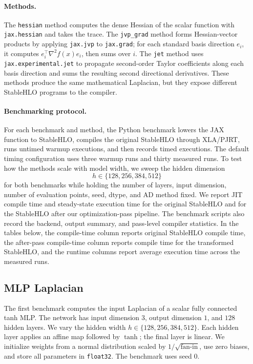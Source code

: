 \documentclass{article}
\theoremstyle{plain}
\theoremstyle{definition}
\theoremstyle{remark}
\begin{document}
\paragraph{Methods.}
The \texttt{hessian} method computes the dense Hessian of the scalar function
with \texttt{jax.hessian} and takes the trace.  The \texttt{jvp\_grad} method
forms Hessian-vector products by applying \texttt{jax.jvp} to
\texttt{jax.grad}; for each standard basis direction \(e_i\), it computes
\(e_i^\top \nabla^2 f(x)e_i\), then sums over \(i\).  The \texttt{jet} method
uses \texttt{jax.experimental.jet} to propagate second-order Taylor
coefficients along each basis direction and sums the resulting second
directional derivatives.  These methods produce the same mathematical
Laplacian, but they expose different StableHLO programs to the compiler.

\paragraph{Benchmarking protocol.}
For each benchmark and method, the Python benchmark lowers the JAX function to
StableHLO, compiles the original StableHLO through XLA/PJRT, runs untimed
warmup executions, and then records timed executions.  The default timing
configuration uses three warmup runs and thirty measured runs.  To test how the
methods scale with model width, we sweep the hidden dimension
\[
  h \in \{128, 256, 384, 512\}
\]
for both benchmarks while holding the number of layers, input dimension, number
of evaluation points, seed, dtype, and AD method fixed.  We report JIT compile
time and steady-state execution time for the original StableHLO and for the
StableHLO after our optimization-pass pipeline.  The benchmark scripts also
record the backend, output summary, and pass-level compiler statistics.  In the
tables below, the compile-time column reports original StableHLO compile time,
the after-pass compile-time column reports compile time for the transformed
StableHLO, and the runtime columns report average execution time across the
measured runs.

\subsection{MLP Laplacian}
The first benchmark computes the input Laplacian of a scalar fully connected
tanh MLP.  The network has input dimension \(3\), output dimension \(1\), and
\(128\) hidden layers.  We vary the hidden width
\(h \in \{128,256,384,512\}\).  Each hidden layer applies an affine map followed
by \(\tanh\); the final layer is linear.  We initialize weights from a normal
distribution scaled by \(1/\sqrt{\text{fan-in}}\), use zero biases, and store
all parameters in \texttt{float32}.  The benchmark uses seed \(0\).
\end{document}

